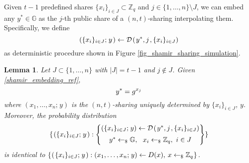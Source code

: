 \documentclass[psamsfonts, reqno]{amsart}
\newtheorem{lem}[thm]{Lemma}
\theoremstyle{definition}
\theoremstyle{remark}
\numberwithin{equation}{section}
\begin{document}
Given $t-1$ predefined shares
$\{x_i\}_{i \in J} \subset \mathbb{Z}_q$
and $j \in \{1, \dots, n\} \setminus J$,
we can embed any $y^* \in \mathbb{G}$
as the $j$-th public share of a $(n, t)$-sharing
interpolating them.
Specifically, we define
\vspace{5pt}
\begin{equation}\label{shamir_embedding_ref}
(\{x_i\}_{i \in J};\hspace{1pt} y\hspace{1pt}) \leftarrow
\mathcal{D}\hspace{1pt}(\hspace{1pt}y^*, j\hspace{1pt}, \{x_i\}_{i \in J})
\vspace{5pt}
\end{equation}
as deterministic procedure
shown in Figure \ref{fig_shamir_sharing_simulation}.

\begin{lem}\label{shamir_sharing_simulation_lemma}
Let $J \subset \{1, \dots, n\}$ with $|J| = t-1$
and $j \not \in J$.
Given \eqref{shamir_embedding_ref},
\vspace{5pt}
\begin{equation*}
y^* = g ^ {x_j}
\vspace{5pt}
\end{equation*}
where $(x_1, \dots, x_n;\hspace{1pt} y)$
is the $(n, t)$-sharing uniquely determined by
$\{x_i\}_{i \in J}$, $y$.
Moreover, the probability distribution
\vspace{5pt}
\begin{equation*}\label{sharing_dist_simulated}
\{\hspace{1pt}(\{x_i\}_{i \in J};\hspace{1pt} y\hspace{1pt}):
\begin{Bmatrix}
(\{x_i\}_{i \in J};\hspace{1pt} y) \leftarrow
\mathcal{D}\hspace{1pt}(\hspace{1pt}y^*, j\hspace{1pt}, \{x_i\}_{i \in J})\\[5pt]
y^* \leftarrow_\$ \mathbb{G},\ \ x_i\leftarrow_\$ \mathbb{Z}_q,\ i \in J\\[1pt]
\end{Bmatrix}
\}\\[5pt]
\end{equation*}
is identical to
$
\{
\hspace{0.5pt}
(\hspace{1pt}\{x_i\}_{i \in J};\hspace{1pt} y\hspace{1pt}):
(x_1, \dots, x_n;\hspace{1pt} y) \leftarrow D(x),
\hspace{2pt} x \leftarrow_\$ \mathbb{Z}_q
\hspace{0.5pt}
\}
$\hspace{1pt}.
\end{lem}
\end{document}
